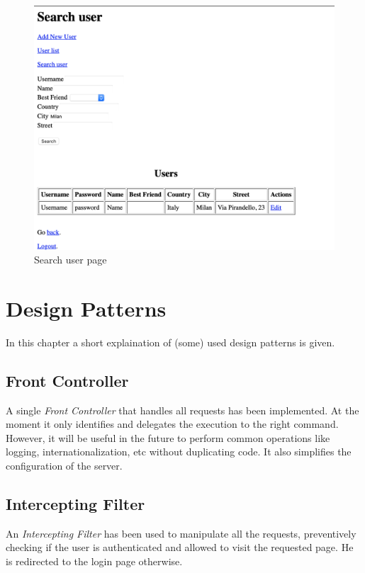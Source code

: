 \documentclass[a4paper]{report}
\begin{document}
	\begin{figure}[ht]
		\centering
		\includegraphics[scale=0.7]{images/usersearch.png}
		\caption{Search user page}
		\label{fig:search_user}
	\end{figure} 
	
	\chapter{Design Patterns}
	\label{cap:design_patterns}
	
	In this chapter a short explaination of (some) used design patterns is given.
	
	\section{Front Controller}
	\label{sec:front_controller}
	
	A single \textit{Front Controller} that handles all requests has been implemented. At the moment it only identifies and delegates the execution to the right command. However, it will be useful in the future to perform common operations like logging, internationalization, etc without duplicating code. It also simplifies the configuration of the server.
	
	\section{Intercepting Filter}
	\label{sec:intercepting_filter}

	An \textit{Intercepting Filter} has been used to manipulate all the requests, preventively checking if the user is authenticated and allowed to visit the requested page. He is redirected to the login page otherwise.
	
\end{document}
